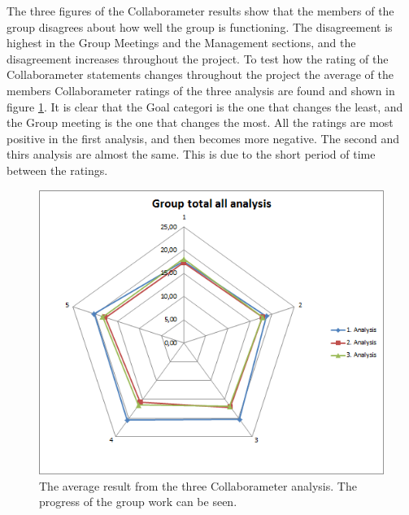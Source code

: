 The three figures of the Collaborameter results show that the members of the group disagrees about how well the group is functioning. The disagreement is highest in the Group Meetings and the Management sections, and the disagreement increases throughout the project. To test how the rating of the Collaborameter statements changes throughout the project the average of the members Collaborameter ratings of the three analysis are found and shown in figure \ref{fig:ALLanalysisCollaborameter}. It is clear that the Goal categori is the one that changes the least, and the Group meeting is the one that changes the most. All the ratings are most positive in the first analysis, and then becomes more negative. The second and thirs analysis are almost the same. This is due to the short period of time between the ratings. 
\begin{figure}
\centering
\includegraphics[width=0.7\linewidth]{./graphics/ALLanalysisCollaborameter}
\caption[Average result of the Collaborameter results]{The average result from the three Collaborameter analysis. The progress of the group work can be seen.}
\label{fig:ALLanalysisCollaborameter}
\end{figure}

